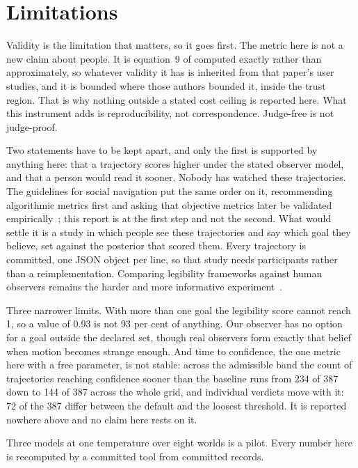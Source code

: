 \documentclass[sigconf,nonacm]{acmart}
\begin{document}
\section{Limitations}

Validity is the limitation that matters, so it goes first. The metric
here is not a new claim about people. It is equation~9 of
\cite{dragan2013legibility} computed exactly rather than approximately,
so whatever validity it has is inherited from that paper's user studies,
and it is bounded where those authors bounded it, inside the trust
region. That is why nothing outside a stated cost ceiling is reported
here. What this instrument adds is reproducibility, not correspondence.
Judge-free is not judge-proof.

Two statements have to be kept apart, and only the first is supported by
anything here: that a trajectory scores higher under the stated observer
model, and that a person would read it sooner. Nobody has watched these
trajectories. The guidelines for social navigation put the same order on
it, recommending algorithmic metrics first and asking that objective
metrics later be validated empirically~\cite{francis2025principles}; this
report is at the first step and not the second. What would settle it is a
study in which people see these trajectories and say which goal they
believe, set against the posterior that scored them. Every trajectory is
committed, one JSON object per line, so that study needs participants
rather than a reimplementation. Comparing legibility frameworks against
human observers remains the harder and more informative
experiment~\cite{wallkotter2022evaluating}.

Three narrower limits. With more than one goal the legibility score
cannot reach 1, so a value of 0.93 is not 93 per cent of anything. Our
observer has no option for a goal outside the declared set, though real
observers form exactly that belief when motion becomes strange enough.
And time to confidence, the one metric here with a free parameter, is not
stable: across the admissible band the count of trajectories reaching
confidence sooner than the baseline runs from 234 of 387 down to 144 of
387 across the whole grid, and individual verdicts move with it: 72 of
the 387 differ between the default and the loosest threshold. It is reported nowhere above and no
claim here rests on it.

Three models at one temperature over eight worlds is a pilot. Every number
here is recomputed by a committed tool from committed records.
\end{document}
